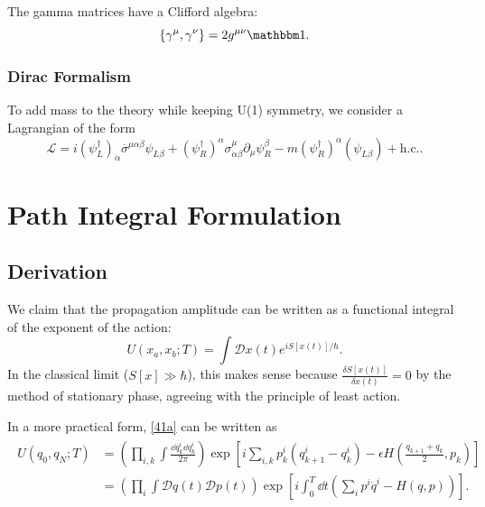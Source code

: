 \documentclass{article}
\begin{document}
The gamma matrices have a Clifford algebra:
$$\acomm{\gamma^\mu}{\gamma^\nu}=2g^{\mu\nu}\mathbbm 1.$$

\subsubsection{Dirac Formalism}

To add mass to the theory while keeping U(1) symmetry, we consider a Lagrangian of the form 
$$\mathcal L=i(\psi^\dag_L)_{\dot\alpha}\overline\sigma^{\mu\alpha\dot\beta}\psi_{L\beta}+(\psi^\dag_R)^\alpha\sigma^\mu_{\dot\alpha\beta}\partial_\mu\psi^{\dot\beta}_R-m(\psi^\dag_R)^\alpha(\psi_{L\beta})+\text{h.c.}.$$

\pagebreak

\section{Path Integral Formulation}

\subsection{Derivation}

We claim that the propagation amplitude can be written as a functional integral of the exponent of the action:
\begin{equation}
    U(x_a,x_b;T)=\int\mathcal Dx(t)e^{iS[x(t)]/\hbar}.
    \label{41a}
\end{equation}
In the classical limit ($S[x]\gg\hbar$), this makes sense because $\frac{\delta S[x(t)]}{\delta x(t)}=0$ by the method of stationary phase, agreeing with the principle of least action. 

In a more practical form, \eqref{41a} can be written as 
\begin{align}
    \begin{split}
        U(q_0,q_N;T)&=\left(\prod_{i,k}\int\frac{\dd q^i_k\dd q^i_k}{2\pi}\right)\exp\left[i\sum_{i,k}p^i_k(q^i_{k+1}-q^i_k)-\epsilon H\left(\frac{q_{k+1}+q_k}{2},p_k\right)\right]\\
        &=\left(\prod_i\int\mathcal Dq(t)\mathcal Dp(t)\right)\exp\left[i\int^T_0\dd t\left(\sum_ip^i\dot q^i-H(q,p)\right)\right].
    \end{split}
\end{align}
\end{document}
